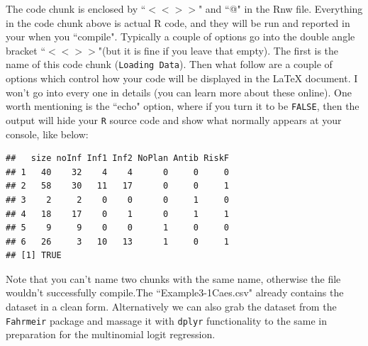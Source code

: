 \documentclass{article}\usepackage[]{graphicx}\usepackage[]{color}
\makeatletter
\newenvironment{kframe}{%
 \def\at@end@of@kframe{}%
 \ifinner\ifhmode%
  \def\at@end@of@kframe{\end{minipage}}%
  \begin{minipage}{\columnwidth}%
 \fi\fi%
 \def\FrameCommand##1{\hskip\@totalleftmargin \hskip-\fboxsep
 \colorbox{shadecolor}{##1}\hskip-\fboxsep
     \hskip-\linewidth \hskip-\@totalleftmargin \hskip\columnwidth}%
 \MakeFramed {\advance\hsize-\width
   \@totalleftmargin\z@ \linewidth\hsize
   \@setminipage}}%
 {\par\unskip\endMakeFramed%
 \at@end@of@kframe}
\newenvironment{knitrout}{}{} %
\makeatother
\begin{document}
The code chunk is enclosed by ``$<<>>$" and ``@" in the Rnw file. Everything in the code chunk above is actual R code, and they will be run and reported in your  when you ``compile". Typically a  couple of options  go into the double angle bracket ``$<<>>$"(but it is fine if you leave that empty). The first is the name of this code chunk (\texttt{Loading Data}). Then what follow are a couple of options which control how your code will be displayed in the LaTeX document. I won't go into every one in details (you can learn more about these online). One worth mentioning is the ``echo" option, where if you turn it to be \texttt{FALSE}, then the output will hide your \texttt{R} source code and show what normally appears at your console, like below:


\begin{knitrout}
\color{fgcolor}\begin{kframe}
\begin{verbatim}
##   size noInf Inf1 Inf2 NoPlan Antib RiskF
## 1   40    32    4    4      0     0     0
## 2   58    30   11   17      0     0     1
## 3    2     2    0    0      0     1     0
## 4   18    17    0    1      0     1     1
## 5    9     9    0    0      1     0     0
## 6   26     3   10   13      1     0     1
## [1] TRUE
\end{verbatim}
\end{kframe}
\end{knitrout}

Note that you can't name two chunks with the same name, otherwise the file wouldn't successfully compile.The ``Example3-1Caes.csv" already contains the dataset in a clean form. Alternatively we can also grab the dataset from the \texttt{Fahrmeir} package and massage it with \texttt{dplyr} functionality to the same in preparation for the multinomial logit regression. 
\end{document}
